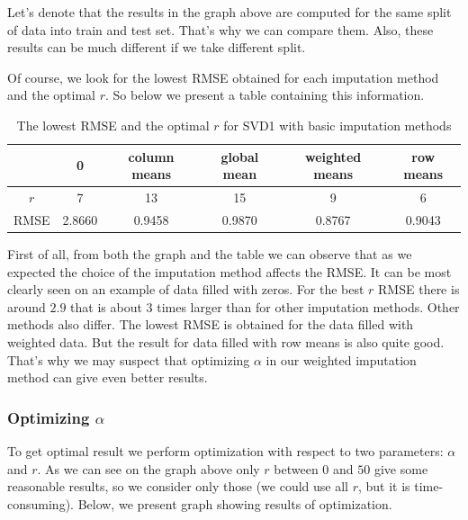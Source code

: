 \documentclass[10pt]{amsart}
\begin{document}
Let's denote that the results in the graph above are computed for the same split of data into train and test set.
That's why we can compare them.
Also, these results can be much different if we take different split.

Of course, we look for the lowest RMSE obtained for each imputation method and the optimal $r$.
So below we present a table containing this information.
\begin{table}[H]
\begin{tabular}{c|ccccc}
& 0 & column means & global mean & weighted means & row means \\
\hline
$r$ & 7 & 13 & 15 & 9 & 6 \\
RMSE & 2.8660 & 0.9458 & 0.9870 & 0.8767 & 0.9043 \\
\end{tabular}
\caption{The lowest RMSE and the optimal $r$ for SVD1 with basic imputation methods}
\end{table}

First of all, from both the graph and the table we can observe that as we expected the choice of the imputation method affects the RMSE.
It can be most clearly seen on an example of data filled with zeros.
For the best $r$ RMSE there is around $2.9$ that is about 3 times larger than for other imputation methods.
Other methods also differ.
The lowest RMSE is obtained for the data filled with weighted data.
But the result for data filled with row means is also quite good.
That's why we may suspect that optimizing $\alpha$ in our weighted imputation method can give even better results.


\subsubsection*{Optimizing $\alpha$}

To get optimal result we perform optimization with respect to two parameters: $\alpha$ and $r$.
As we can see on the graph above only $r$ between $0$ and $50$ give some reasonable results, so we consider only those (we could use all $r$, but it is time-consuming).
Below, we present graph showing results of optimization.
\end{document}
